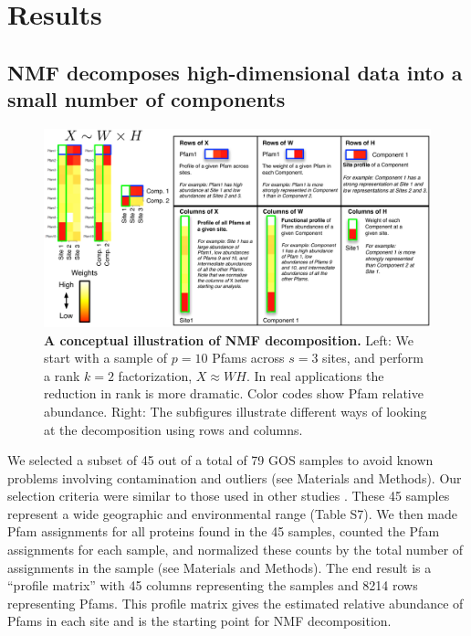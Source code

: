 \section{Results}

\subsection{NMF decomposes high-dimensional data into a small number of components}

\begin{figure}
\centering
\includegraphics[width=\textwidth]{NMF/figures/fig1}
\caption{\textbf{A conceptual illustration of NMF decomposition.} Left: We start with a sample of $p=10$ Pfams across $s=3$ sites, and perform a rank $k=2$ factorization, $X\approx WH$. In real applications the reduction in rank is more dramatic. Color codes show Pfam relative abundance. Right: The subfigures illustrate different ways of looking at the decomposition using rows and columns.}
\label{NMF_fig1}
\end{figure}

We selected a subset of 45 out of a total of 79 GOS samples to avoid known problems involving contamination and outliers (see Materials and Methods).  Our selection criteria were similar to those used in other studies \cite{gianoulis_quantifying_2009, patel_analysis_2010, raes_toward_2011}. These 45 samples represent a wide geographic and environmental range (Table S7). We then made Pfam assignments for all proteins found in the 45 samples, counted the Pfam assignments for each sample, and normalized these counts by the total number of assignments in the sample (see Materials and Methods). The end result is a ``profile matrix'' with 45 columns representing the samples and 8214 rows representing Pfams. This profile matrix gives the estimated relative abundance of Pfams in each site and is the starting point for NMF decomposition. 

